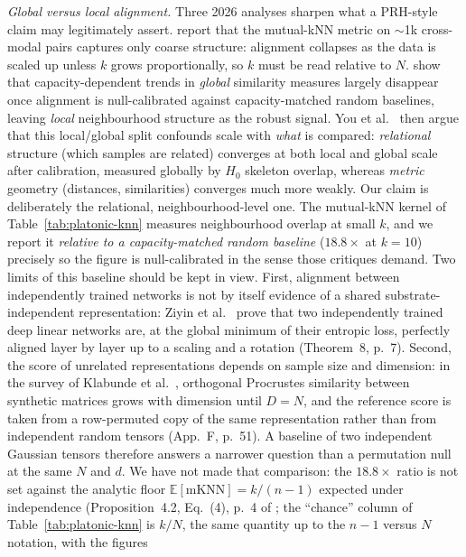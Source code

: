 \documentclass[10pt,twocolumn]{article}
\begin{document}
\textit{Global versus local alignment.} Three 2026 analyses sharpen what
a PRH-style claim may legitimately assert.
\cite{platoscave2026} report that the mutual-kNN metric on $\sim$1k
cross-modal pairs captures only coarse structure: alignment collapses as
the data is scaled up unless $k$ grows proportionally, so $k$ must be read
relative to $N$. \cite{aristotelianprh2026} show that capacity-dependent
trends in \emph{global} similarity measures largely disappear once
alignment is null-calibrated against capacity-matched random baselines,
leaving \emph{local} neighbourhood structure as the robust signal.
You et al.~\cite{you2026structure} then argue that this local/global
split confounds scale with \emph{what} is compared: \emph{relational}
structure (which samples are related) converges at both local and global
scale after calibration, measured globally by $H_0$ skeleton overlap,
whereas \emph{metric} geometry (distances, similarities) converges
much more weakly. Our claim is deliberately the relational,
neighbourhood-level one. The mutual-kNN kernel of
Table~\ref{tab:platonic-knn} measures neighbourhood overlap at small
$k$, and we report it \emph{relative to a capacity-matched random
baseline} ($18.8\times$ at $k{=}10$) precisely so the figure is
null-calibrated in the sense those critiques demand. Two limits of
this baseline should be kept in view. First, alignment between
independently trained networks is not by itself evidence of a shared
substrate-independent representation: Ziyin et
al.~\cite{ziyin2025neural} prove that two independently trained deep
linear networks are, at the global minimum of their entropic loss,
perfectly aligned layer by layer up to a scaling and a rotation
(Theorem~8, p.~7). Second, the score of unrelated representations
depends on sample size and dimension: in the survey of Klabunde et
al.~\cite{klabunde2025similarity}, orthogonal Procrustes similarity
between synthetic matrices grows with dimension until $D = N$, and
the reference score is taken from a row-permuted copy of the same
representation rather than from independent random tensors
(App.~F, p.~51). A baseline of two independent Gaussian tensors
therefore answers a narrower question than a permutation null at the
same $N$ and $d$. We have not made that comparison: the
$18.8\times$ ratio is not set against the analytic floor
$\mathbb{E}[\mathrm{mKNN}]=k/(n-1)$ expected under independence
(Proposition~4.2, Eq.~(4), p.~4 of \cite{aristotelianprh2026}; the
``chance'' column of Table~\ref{tab:platonic-knn} is $k/N$, the same
quantity up to the $n-1$ versus $N$ notation, with the figures
\end{document}
